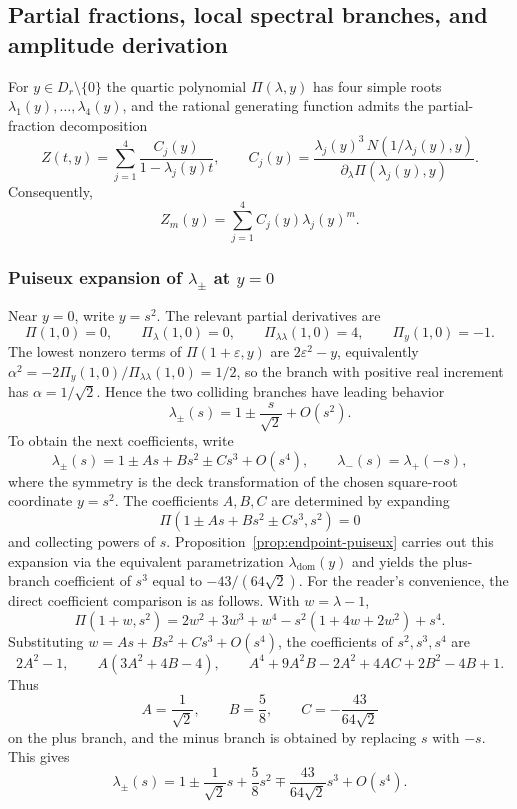 \subsection{Partial fractions, local spectral branches, and amplitude derivation}

For $y\in D_r\setminus\{0\}$ the quartic polynomial $\Pi(\lambda,y)$ has four simple roots $\lambda_1(y),\dots,\lambda_4(y)$, and the rational generating function admits the partial-fraction decomposition
\begin{equation}\label{eq:partial-fractions}
Z(t,y)=\sum_{j=1}^4 \frac{C_j(y)}{1-\lambda_j(y)t},
\qquad
C_j(y)=\frac{\lambda_j(y)^3\,N(1/\lambda_j(y),y)}{\partial_\lambda\Pi(\lambda_j(y),y)}.
\end{equation}
Consequently,
\begin{equation}\label{eq:spectral-decomposition}
Z_m(y)=\sum_{j=1}^4 C_j(y)\lambda_j(y)^m.
\end{equation}

\subsubsection*{Puiseux expansion of \texorpdfstring{$\lambda_\pm$}{lambda\_pm} at \texorpdfstring{$y=0$}{y=0}}

Near $y=0$, write $y=s^2$.
The relevant partial derivatives are
\[
\Pi(1,0)=0,\qquad
\Pi_\lambda(1,0)=0,\qquad
\Pi_{\lambda\lambda}(1,0)=4,\qquad
\Pi_y(1,0)=-1.
\]
The lowest nonzero terms of \(\Pi(1+\varepsilon,y)\) are \(2\varepsilon^2-y\), equivalently \(\alpha^2=-2\Pi_y(1,0)/\Pi_{\lambda\lambda}(1,0)=1/2\), so the branch with positive real increment has \(\alpha=1/\sqrt2\).
Hence the two colliding branches have leading behavior
\[
\lambda_\pm(s)=1\pm \frac{s}{\sqrt2}+O(s^2).
\]
To obtain the next coefficients, write
\[
\lambda_\pm(s)=1\pm As+Bs^2\pm Cs^3+O(s^4),
\qquad \lambda_-(s)=\lambda_+(-s),
\]
where the symmetry is the deck transformation of the chosen square-root coordinate \(y=s^2\).
The coefficients $A,B,C$ are determined by expanding
\[
\Pi(1\pm As+Bs^2\pm Cs^3,s^2)=0
\]
and collecting powers of $s$.
Proposition~\ref{prop:endpoint-puiseux} carries out this expansion via the equivalent parametrization $\lambda_{\mathrm{dom}}(y)$ and yields the plus-branch coefficient of $s^3$ equal to $-43/(64\sqrt2)$.
For the reader's convenience, the direct coefficient comparison is as follows.  With \(w=\lambda-1\),
\[
\Pi(1+w,s^2)=2w^2+3w^3+w^4-s^2(1+4w+2w^2)+s^4.
\]
Substituting \(w=As+Bs^2+Cs^3+O(s^4)\), the coefficients of \(s^2,s^3,s^4\) are
\[
2A^2-1,
\qquad
A(3A^2+4B-4),
\qquad
A^4+9A^2B-2A^2+4AC+2B^2-4B+1.
\]
Thus
\[
A=\frac1{\sqrt2},
\qquad
B=\frac58,
\qquad
C=-\frac{43}{64\sqrt2}
\]
on the plus branch, and the minus branch is obtained by replacing \(s\) with \(-s\).
This gives
\begin{equation}\label{eq:lambda-plus-minus}
\lambda_\pm(s)
=
1\pm \frac{1}{\sqrt2}s+\frac58 s^2 \mp \frac{43}{64\sqrt2}s^3+O(s^4).
\end{equation}

